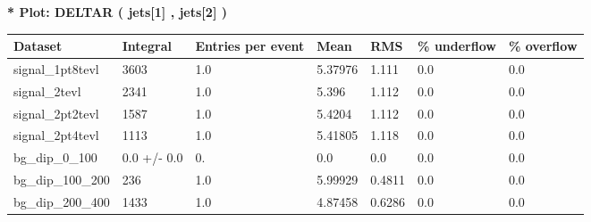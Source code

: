 \documentclass[a4paper, 10pt]{article}
\begin{document}
\textbf{* Plot: DELTAR ( jets[1] , jets[2] ) }\\
   \begin{table}[H]
  \begin{center}
    \begin{tabular}{|m{23.0mm}|m{23.0mm}|m{18.0mm}|m{19.0mm}|m{19.0mm}|m{19.0mm}|m{19.0mm}|}
      \hline
      {\cellcolor{yellow}         Dataset}& {\cellcolor{yellow}         Integral}& {\cellcolor{yellow}         Entries per event}& {\cellcolor{yellow}         Mean}& {\cellcolor{yellow}         RMS}& {\cellcolor{yellow}         \% underflow}& {\cellcolor{yellow}         \% overflow}\\
      \hline
      {\cellcolor{white}         signal\_1pt8tevl}& {\cellcolor{white}         3603}& {\cellcolor{white}         1.0}& {\cellcolor{white}         5.37976}& {\cellcolor{white}         1.111}& {\cellcolor{green}         0.0}& {\cellcolor{green}         0.0}\\
      \hline
      {\cellcolor{white}         signal\_2tevl}& {\cellcolor{white}         2341}& {\cellcolor{white}         1.0}& {\cellcolor{white}         5.396}& {\cellcolor{white}         1.112}& {\cellcolor{green}         0.0}& {\cellcolor{green}         0.0}\\
      \hline
      {\cellcolor{white}         signal\_2pt2tevl}& {\cellcolor{white}         1587}& {\cellcolor{white}         1.0}& {\cellcolor{white}         5.4204}& {\cellcolor{white}         1.112}& {\cellcolor{green}         0.0}& {\cellcolor{green}         0.0}\\
      \hline
      {\cellcolor{white}         signal\_2pt4tevl}& {\cellcolor{white}         1113}& {\cellcolor{white}         1.0}& {\cellcolor{white}         5.41805}& {\cellcolor{white}         1.118}& {\cellcolor{green}         0.0}& {\cellcolor{green}         0.0}\\
      \hline
      {\cellcolor{white}         bg\_dip\_0\_100}& {\cellcolor{white}         0.0 +/\-- 0.0}& {\cellcolor{white}         0.}& {\cellcolor{white}         0.0}& {\cellcolor{white}         0.0}& {\cellcolor{green}         0.0}& {\cellcolor{green}         0.0}\\
      \hline
      {\cellcolor{white}         bg\_dip\_100\_200}& {\cellcolor{white}         236}& {\cellcolor{white}         1.0}& {\cellcolor{white}         5.99929}& {\cellcolor{white}         0.4811}& {\cellcolor{green}         0.0}& {\cellcolor{green}         0.0}\\
      \hline
      {\cellcolor{white}         bg\_dip\_200\_400}& {\cellcolor{white}         1433}& {\cellcolor{white}         1.0}& {\cellcolor{white}         4.87458}& {\cellcolor{white}         0.6286}& {\cellcolor{green}         0.0}& {\cellcolor{green}         0.0}\\

\end{tabular}
\end{center}
\end{table}
\end{document}
